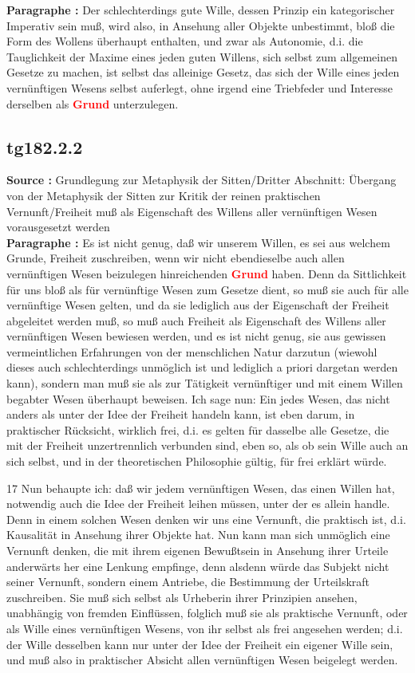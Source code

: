 \documentclass[a4paper,12pt,twoside]{book}
\newcommand{\match}[1]{\textcolor{red}{\textbf{#1}}}
\begin{document}
	\noindent\textbf{Paragraphe : }Der schlechterdings gute Wille, dessen Prinzip ein kategorischer Imperativ sein muß, wird also, in Ansehung aller Objekte unbestimmt, bloß die Form des Wollens überhaupt enthalten, und zwar als Autonomie, d.i. die Tauglichkeit der Maxime eines jeden guten Willens, sich selbst zum allgemeinen Gesetze zu machen, ist selbst das alleinige Gesetz, das sich der Wille eines jeden vernünftigen Wesens selbst auferlegt, ohne irgend eine Triebfeder und Interesse derselben als \match{Grund} unterzulegen. 
	
	\subsection*{tg182.2.2} 
	\textbf{Source : }Grundlegung zur Metaphysik der Sitten/Dritter Abschnitt: Übergang von der Metaphysik der Sitten zur Kritik der reinen praktischen Vernunft/Freiheit muß als Eigenschaft des Willens aller vernünftigen Wesen vorausgesetzt werden\\  
	
	\noindent\textbf{Paragraphe : }Es ist nicht genug, daß wir unserem Willen, es sei aus welchem Grunde, Freiheit zuschreiben, wenn wir nicht ebendieselbe auch allen vernünftigen Wesen beizulegen hinreichenden \match{Grund} haben. Denn da Sittlichkeit für uns bloß als für vernünftige Wesen zum Gesetze dient, so muß sie auch für alle vernünftige Wesen gelten, und da sie lediglich aus der Eigenschaft der Freiheit abgeleitet werden muß, so muß auch Freiheit als Eigenschaft des Willens aller vernünftigen  Wesen bewiesen werden, und es ist nicht genug, sie aus gewissen vermeintlichen Erfahrungen von der menschlichen Natur darzutun (wiewohl dieses auch schlechterdings unmöglich ist und lediglich a priori dargetan werden kann), sondern man muß sie als zur Tätigkeit vernünftiger und mit einem Willen begabter Wesen überhaupt beweisen. Ich sage nun: Ein jedes Wesen, das nicht anders als unter der Idee der Freiheit handeln kann, ist eben darum, in praktischer Rücksicht, wirklich frei, d.i. es gelten für dasselbe alle Gesetze, die mit der Freiheit unzertrennlich verbunden sind, eben so, als ob sein Wille auch an sich selbst, und in der theoretischen Philosophie gültig, für frei erklärt würde.
	
	
	17
	Nun behaupte ich: daß wir jedem vernünftigen Wesen, das einen Willen hat, notwendig auch die Idee der Freiheit leihen müssen, unter der es allein handle. Denn in einem solchen Wesen denken wir uns eine Vernunft, die praktisch ist, d.i. Kausalität in Ansehung ihrer Objekte hat. Nun kann man sich unmöglich eine Vernunft denken, die mit ihrem eigenen Bewußtsein in Ansehung ihrer Urteile anderwärts her eine Lenkung empfinge, denn alsdenn würde das Subjekt nicht seiner Vernunft, sondern einem Antriebe, die Bestimmung der Urteilskraft zuschreiben. Sie muß sich selbst als Urheberin ihrer Prinzipien ansehen, unabhängig von fremden Einflüssen, folglich muß sie als praktische Vernunft, oder als Wille eines vernünftigen Wesens, von ihr selbst als frei angesehen werden; d.i. der Wille desselben kann nur unter der Idee der Freiheit ein eigener Wille sein, und muß also in praktischer Absicht allen vernünftigen Wesen beigelegt werden. 
	
\end{document}
